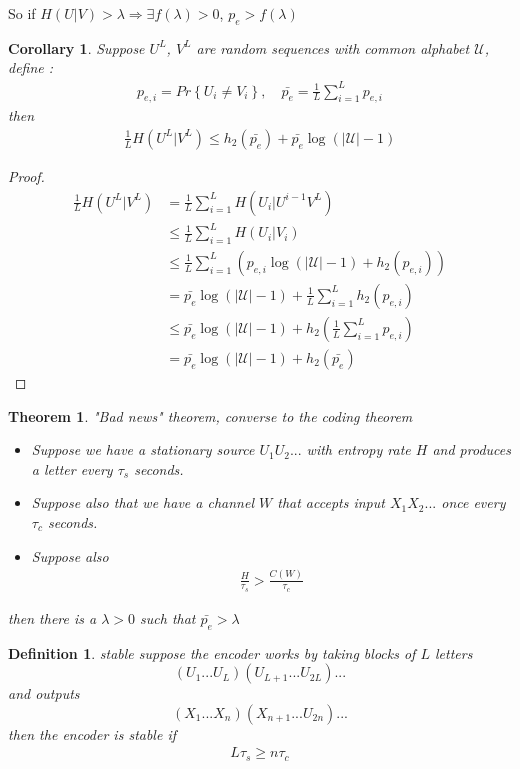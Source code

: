 \documentclass{article}
\newtheorem{theorem}{Theorem}[section]
\newtheorem{corollary}{Corollary}[theorem]
\newtheorem{definition}{Definition}[section]
\theoremstyle{definition} %
\renewcommand{\Pr}[1]{Pr\left\{#1\right\}}
\def\U{\mathcal{U}}
\begin{document}
So if $H(U|V) > \lambda \Rightarrow \exists f(\lambda) > 0$, $p_e > f(\lambda)$

\begin{corollary}
  Suppose $U^L$, $V^L$ are random sequences with common alphabet $\U$, define :
  \begin{align*}
    p_{e,i} = \Pr{U_i \neq V_i} , \quad
    \bar{p_e} = \frac{1}{L} \sum_{i = 1}^{L} p_{e,i}
  \end{align*}
  then
  \begin{align*}
    \frac{1}{L} H(U^L | V^L) \leq h_2(\bar{p_e}) + \bar{p_e} \log(|\U| - 1)
  \end{align*}
\end{corollary}

\begin{proof}
  \begin{align*}
    \frac{1}{L} H(U^L | V^L) &= \frac{1}{L} \sum_{i = 1}^{L} H(U_i | U^{i-1} V^L) \\
    &\leq \frac{1}{L} \sum_{i = 1}^{L} H(U_i | V_i) \\
    &\leq \frac{1}{L} \sum_{i = 1}^{L}(p_{e,i} \log(|\U| - 1) + h_2(p_{e, i})) \\
    &= \bar{p_e} \log(|\U| - 1) + \frac{1}{L} \sum_{i = 1}^L h_2(p_{e,i}) \\
    &\leq \bar{p_e} \log(|\U| - 1) + h_2(\frac{1}{L} \sum_{i = 1}^L p_{e,i}) \\
    &= \bar{p_e} \log(|\U| - 1) + h_2(\bar{p_e})
  \end{align*}
\end{proof}

\begin{theorem}{"Bad news" theorem, converse to the coding theorem}
  \begin{itemize}
    \item Suppose we have a stationary source $U_1 U_2 ...$ with entropy rate $H$ and produces a letter every $\tau_s$ seconds.
    \item Suppose also that we have a channel $W$ that accepts input $X_1 X_2 ...$ once every $\tau_c$ seconds.
    \item Suppose also
    \begin{align*}
      \frac{H}{\tau_s} > \frac{C(W)}{\tau_c}
    \end{align*}
  \end{itemize}
  then there is a $\lambda > 0$ such that $\bar{p_e} > \lambda$
\end{theorem}

\begin{definition}{stable}
  suppose the encoder works by taking blocks of $L$ letters
  $$(U_1 ... U_L)(U_{L+1} ... U_{2L})...$$
  and outputs
  $$(X_1 ... X_n)(X_{n+1} ... U_{2n})...$$
  then the encoder is stable if
  \begin{align*}
    L \tau_s \geq n \tau_c
  \end{align*}
\end{definition}
\end{document}
